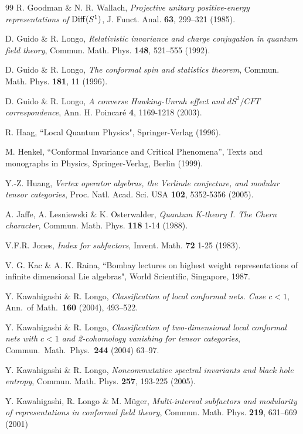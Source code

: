\documentclass[11pt]{article}
\begin{document}
{{\begin{thebibliography}{99}
 R. Goodman \& N. R. Wallach, {\it Projective unitary
positive-energy representations of ${\rm Diff}(S^1)$}, 
J. Funct. Anal. {\bf 63}, 299--321 (1985).

 D. Guido \& R. Longo, 
{\it Relativistic invariance and charge conjugation in quantum field theory}, 
Commun. Math. Phys. {\bf 148},  521--555 (1992).

 D. Guido \& R. Longo, 
{\it The conformal spin and statistics theorem},
Commun. Math. Phys. {\bf 181}, 11 (1996).

 D. Guido \& R. Longo, 
{\it A converse Hawking-Unruh effect and $dS^2/CFT$ correspondence}, 
Ann. H. Poincar\'{e} {\bf 4}, 1169-1218 (2003). 

 R. Haag, 
``Local Quantum Physics", Springer-Verlag (1996). 

 M. Henkel,
``Conformal Invariance and Critical Phenomena'', Texts and monographs in Physics, Springer-Verlag, Berlin (1999).

 Y.-Z. Huang, 
{\it Vertex operator algebras, the Verlinde conjecture, and modular tensor  
categories},  Proc. Natl. Acad. Sci. USA  {\bf 102}, 5352-5356  (2005).
 
 A. Jaffe, A. Lesniewski \& K. Osterwalder, 
{\it Quantum K-theory I. The Chern character}, Commun. Math. Phys. {\bf 118} 
1-14 (1988). 
 
 V.F.R. Jones,
{\it Index for subfactors}, Invent. Math. {\bf 72} 1-25 (1983).
 
 V. G. Kac \& A. K. Raina, 
``Bombay lectures on highest weight representations of infinite dimensional Lie algebras",
World Scientific, Singapore, 1987.

Y. Kawahigashi \& R. Longo,
{\it Classification of local conformal nets. Case $c<1$},
Ann.\ of Math.\ {\bf 160} (2004), 493--522.

Y. Kawahigashi \& R. Longo,
{\it  Classification of two-dimensional local conformal nets with
$c<1$ and 2-cohomology vanishing for tensor categories},
Commun.\ Math.\ Phys.\  {\bf 244} (2004) 63--97.

 Y. Kawahigashi \& R. Longo, 
{\it Noncommutative spectral invariants and black hole entropy}, 
Commun. Math. Phys. {\bf 257}, 193-225 (2005).
 
 Y. Kawahigashi, R. Longo \& M. M\"uger, 
{\it Multi-interval subfactors and modularity of representations
in conformal field theory}, Commun. Math. Phys. {\bf 219},
631--669 (2001) 


\end{thebibliography}}}
\end{document}
